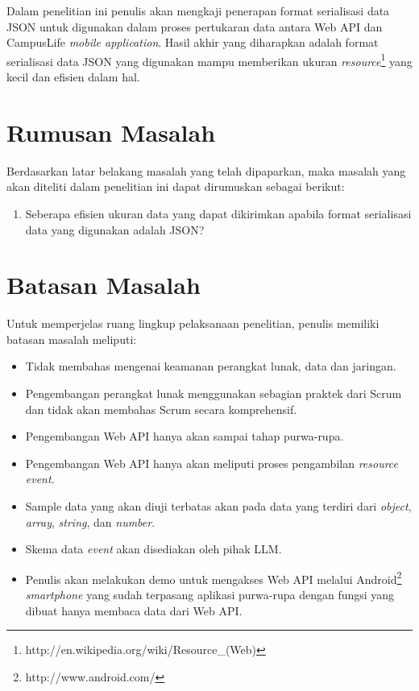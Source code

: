 \documentclass[a4paper, 12pt]{report}
\begin{document}
\onehalfspacing Dalam penelitian ini penulis akan mengkaji penerapan format serialisasi data JSON untuk digunakan dalam proses pertukaran data antara Web API dan CampusLife \textit{mobile application}. Hasil akhir yang diharapkan adalah format serialisasi data JSON yang digunakan mampu memberikan ukuran \textit{resource}\footnote{http://en.wikipedia.org/wiki/Resource\_(Web)} yang kecil dan efisien dalam hal.\cite{json-fat-free}

\section*{Rumusan Masalah}
\onehalfspacing Berdasarkan latar belakang masalah yang telah dipaparkan, maka masalah yang akan diteliti dalam penelitian ini dapat dirumuskan sebagai berikut:
\begin{enumerate}
  \item Seberapa efisien ukuran data yang dapat dikirimkan apabila format serialisasi data yang digunakan adalah JSON?
\end{enumerate}

\section*{Batasan Masalah}
\onehalfspacing Untuk memperjelas ruang lingkup pelaksanaan penelitian, penulis memiliki batasan masalah meliputi:
\onehalfspacing
\begin{itemize}
  \item Tidak membahas mengenai keamanan perangkat lunak, data dan jaringan.
  \item Pengembangan perangkat lunak menggunakan sebagian praktek dari Scrum dan tidak akan membahas Scrum secara komprehensif.
  \item Pengembangan Web API hanya akan sampai tahap purwa-rupa.
  \item Pengembangan Web API hanya akan meliputi proses pengambilan \textit{resource} \textit{event}.
  \item Sample data yang akan diuji terbatas akan pada data yang terdiri dari \textit{object}, \textit{array}, \textit{string}, dan \textit{number}.
  \item Skema data \textit{event} akan disediakan oleh pihak LLM.
  \item Penulis akan melakukan demo untuk mengakses Web API melalui Android\footnote{http://www.android.com/} \textit{smartphone} yang sudah terpasang aplikasi purwa-rupa dengan fungsi yang dibuat hanya membaca data dari Web API.
\end{itemize}
\end{document}
